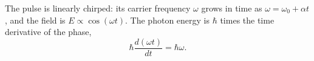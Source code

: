 \documentclass{article}
\begin{document}
The pulse is linearly chirped: its carrier frequency $\omega$ grows in time as
$\omega = \omega_0 + \alpha t$, and the field is $E \propto \cos(\omega t)$.
The photon energy is $\hbar$ times the time derivative of the phase,
\begin{equation}
\hbar \frac{d(\omega t)}{dt} = \hbar\omega .
\label{eq:chirp}
\end{equation}
\end{document}
